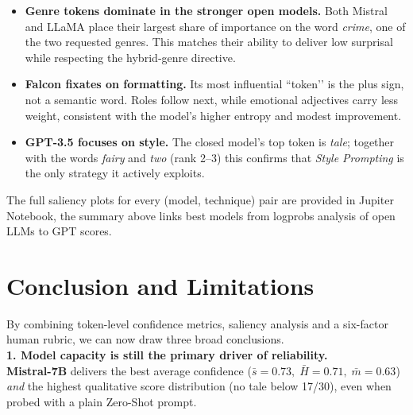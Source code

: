 \documentclass[12pt]{article}
\begin{document}

\begin{itemize}
  \item \textbf{Genre tokens dominate in the stronger open models.}  
        Both Mistral and LLaMA place their largest share of importance
        on the word \emph{crime}, one of the two requested genres.
        This matches their ability to deliver low surprisal while
        respecting the hybrid‐genre directive.
  \item \textbf{Falcon fixates on formatting.}  
        Its most influential “token’’ is the plus sign,
        not a semantic word.  Roles follow next,
        while emotional adjectives carry less weight, consistent with the
        model’s higher entropy and modest improvement.
  \item \textbf{GPT-3.5 focuses on style.}  
        The closed model’s top token is \emph{tale};
        together with the words \emph{fairy} and \emph{two} (rank 2–3)
        this confirms that \emph{Style Prompting} is the only strategy
        it actively exploits.
\end{itemize}

\bigskip
\noindent
The full saliency plots for every (model, technique) pair are provided
in Jupiter Notebook, the summary above links best models from logprobs analysis of open LLMs to GPT scores.


\section{Conclusion and Limitations}

By combining token-level confidence metrics, saliency analysis and a
six-factor human rubric, we can now draw three broad conclusions. \\

\textbf{1. Model capacity is still the primary driver of reliability.}\\

\noindent \textbf{Mistral-7B} delivers the best average confidence
($\bar s=0.73,\;\bar H=0.71,\;\bar m=0.63$) \emph{and} the highest
qualitative score distribution (no tale below 17/30), even when probed
with a plain Zero-Shot prompt. \\
\end{document}
